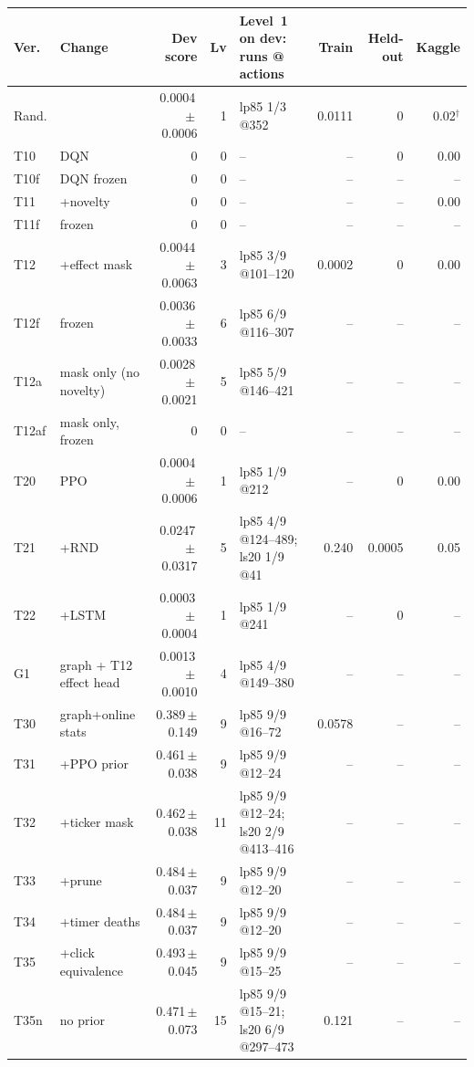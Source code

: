 \begin{tabular}{@{}llrrlrrr@{}}
\toprule
Ver. & Change & Dev score & Lv & Level~1 on dev: runs @ actions & Train & Held-out & Kaggle \\
\midrule
Rand. &  & 0.0004\,$\pm$\,0.0006 & 1 & lp85 1/3 @352 & 0.0111 & 0 & 0.02$^\dagger$ \\
\midrule
T10 & DQN & 0 & 0 & -- & -- & 0 & 0.00 \\
T10f & DQN frozen & 0 & 0 & -- & -- & -- & -- \\
T11 & +novelty & 0 & 0 & -- & -- & -- & 0.00 \\
T11f & frozen & 0 & 0 & -- & -- & -- & -- \\
T12 & +effect mask & 0.0044\,$\pm$\,0.0063 & 3 & lp85 3/9 @101--120 & 0.0002 & 0 & 0.00 \\
T12f & frozen & 0.0036\,$\pm$\,0.0033 & 6 & lp85 6/9 @116--307 & -- & -- & -- \\
T12a & mask only (no novelty) & 0.0028\,$\pm$\,0.0021 & 5 & lp85 5/9 @146--421 & -- & -- & -- \\
T12af & mask only, frozen & 0 & 0 & -- & -- & -- & -- \\
\midrule
T20 & PPO & 0.0004\,$\pm$\,0.0006 & 1 & lp85 1/9 @212 & -- & 0 & 0.00 \\
T21 & +RND & 0.0247\,$\pm$\,0.0317 & 5 & lp85 4/9 @124--489; ls20 1/9 @41 & 0.240 & 0.0005 & 0.05 \\
T22 & +LSTM & 0.0003\,$\pm$\,0.0004 & 1 & lp85 1/9 @241 & -- & 0 & -- \\
\midrule
G1 & graph + T12 effect head & 0.0013\,$\pm$\,0.0010 & 4 & lp85 4/9 @149--380 & -- & -- & -- \\
T30 & graph+online stats & 0.389\,$\pm$\,0.149 & 9 & lp85 9/9 @16--72 & 0.0578 & -- & -- \\
T31 & +PPO prior & 0.461\,$\pm$\,0.038 & 9 & lp85 9/9 @12--24 & -- & -- & -- \\
T32 & +ticker mask & 0.462\,$\pm$\,0.038 & 11 & lp85 9/9 @12--24; ls20 2/9 @413--416 & -- & -- & -- \\
T33 & +prune & 0.484\,$\pm$\,0.037 & 9 & lp85 9/9 @12--20 & -- & -- & -- \\
T34 & +timer deaths & 0.484\,$\pm$\,0.037 & 9 & lp85 9/9 @12--20 & -- & -- & -- \\
T35 & +click equivalence & 0.493\,$\pm$\,0.045 & 9 & lp85 9/9 @15--25 & -- & -- & -- \\
T35n & no prior & 0.471\,$\pm$\,0.073 & 15 & lp85 9/9 @15--21; ls20 6/9 @297--473 & 0.121 & -- & -- \\

\end{tabular}
